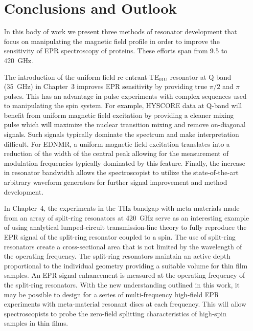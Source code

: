 \chapter[Conclusions and Outlook]{Conclusions and Outlook}

In this body of work we present three methods of resonator development that focus on manipulating the magnetic field profile in order to improve the sensitivity of EPR spectroscopy of proteins. These efforts span from 9.5 to 420~GHz.  

The introduction of the uniform field re-entrant TE$_{\text{01U}}$ resonator at Q-band (35~GHz) in Chapter~3 improves EPR sensitivity by providing true $\pi/2$ and $\pi$ pulses. This has an advantage in pulse experiments with complex sequences used to manipulating the spin system. For example, HYSCORE data at Q-band will benefit from uniform magnetic field excitation by providing a cleaner mixing pulse which will maximize the nuclear transition mixing and remove on-diagonal signals. \cite{Doorslaer2007,Harmer2009} Such signals typically dominate the spectrum and make interpretation difficult. For EDNMR, a uniform magnetic field excitation translates into a reduction of the width of the central peak allowing for the measurement of modulation frequencies typically dominated by this feature. \cite{NicholasCox2013} Finally, the increase in resonator bandwidth allows the spectroscopist to utilize the state-of-the-art arbitrary waveform generators for further signal improvement and method development. \cite{DOLL201327,dSegawa2015,SPINDLER201730,WILI201826,PRISNER201998}

In Chapter~4, the experiments in the THz-bandgap with meta-materials made from an array of split-ring resonators at 420~GHz serve as an interesting example of using analytical lumped-circuit transmission-line theory to fully reproduce the EPR signal of the split-ring resonator coupled to a spin. The use of split-ring resonators create a cross-sectional area that is not limited by the wavelength of the operating frequency. The split-ring resonators maintain an active depth proportional to the individual geometry providing a suitable volume for thin film samples. An EPR signal enhancement is measured at the operating frequency of the split-ring resonators. With the new understanding outlined in this work, it may be possible to design for a series of multi-frequency high-field EPR experiments with meta-material resonant discs at each frequency. This will allow spectroscopists to probe the zero-field splitting characteristics of high-spin samples in thin films.

